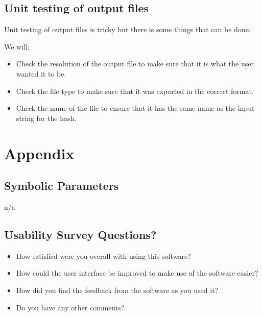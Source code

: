 \documentclass[12pt, titlepage]{article}
\begin{document}
\subsection{Unit testing of output files}
Unit testing of output files  is tricky but there is some things that can be done.

We will;
\begin{itemize}
    \item Check the resolution of the output file to make sure that it is what the user wanted it to be.
    \item Check the file type to make sure that it was exported in the correct format.
    \item Check the name of the file to ensure that it has the same name as the input string for the hash.
\end{itemize}





\newpage

\section{Appendix}

\subsection{Symbolic Parameters}
n/a

\subsection{Usability Survey Questions?}
\begin{itemize}
    \item How satisfied were you overall with using this software?
    \item How could the user interface be improved to make use of the software easier?
    \item How did you find the feedback from the software as you used it?
    \item Do you have any other comments?
\end{itemize}
\end{document}
